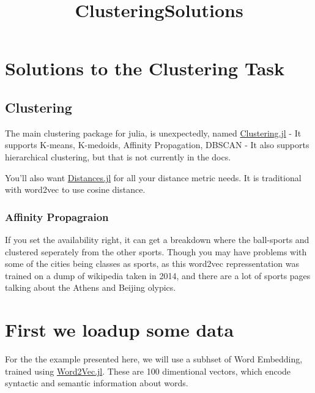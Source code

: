 \documentclass[11pt]{article}
\title{ClusteringSolutions}
\begin{document}
    
    
    \maketitle
    
    

    
    \section{Solutions to the Clustering
Task}\label{solutions-to-the-clustering-task}

    \subsection{Clustering}\label{clustering}

The main clustering package for julia, is unexpectedly, named
\href{https://github.com/JuliaStats/Clustering.jl}{Clustering.jl} - It
supports K-means, K-medoids, Affinity Propagation, DBSCAN - It also
supports hierarchical clustering, but that is not currently in the docs.

You'll also want
\href{https://github.com/JuliaStats/Distances.jl}{Distances.jl} for all
your distance metric needs. It is traditional with word2vec to use
cosine distance.

\subsubsection{Affinity Propagraion}\label{affinity-propagraion}

If you set the availability right, it can get a breakdown where the
ball-sports and clustered seperately from the other sports. Though you
may have problems with some of the cities being classes as sports, as
this word2vec repressentation was trained on a dump of wikipedia taken
in 2014, and there are a lot of sports pages talking about the Athens
and Beijing olypics.

    \section{First we loadup some data}\label{first-we-loadup-some-data}

For the the example presented here, we will use a subhset of Word
Embedding, trained using
\href{https://github.com/tanmaykm/Word2Vec.jl}{Word2Vec.jl}. These are
100 dimentional vectors, which encode syntactic and semantic information
about words.
\end{document}
